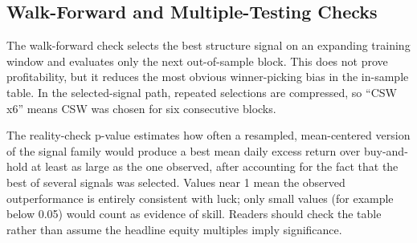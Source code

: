 \documentclass[11pt]{article}
\begin{document}
\subsection{Walk-Forward and Multiple-Testing Checks}

The walk-forward check selects the best structure signal on an expanding training window and evaluates only the next out-of-sample block. This does not prove profitability, but it reduces the most obvious winner-picking bias in the in-sample table. In the selected-signal path, repeated selections are compressed, so ``CSW x6'' means CSW was chosen for six consecutive blocks.

\begin{table}[H]
\centering
\scriptsize
\setlength{\tabcolsep}{4pt}
\caption{Expanding-window walk-forward validation of signal selection. HYPE has too little history for the default train/test split and may show no blocks.}
\end{table}

\begin{table}[H]
\centering
\scriptsize
\setlength{\tabcolsep}{4pt}
\caption{Block-bootstrap uncertainty for the best in-sample structure signal and a simple centered bootstrap reality-check p-value for best excess mean return versus buy-and-hold.}
\end{table}

The reality-check p-value estimates how often a resampled, mean-centered version of the signal family would produce a best mean daily excess return over buy-and-hold at least as large as the one observed, after accounting for the fact that the best of several signals was selected. Values near 1 mean the observed outperformance is entirely consistent with luck; only small values (for example below 0.05) would count as evidence of skill. Readers should check the table rather than assume the headline equity multiples imply significance.
\end{document}
